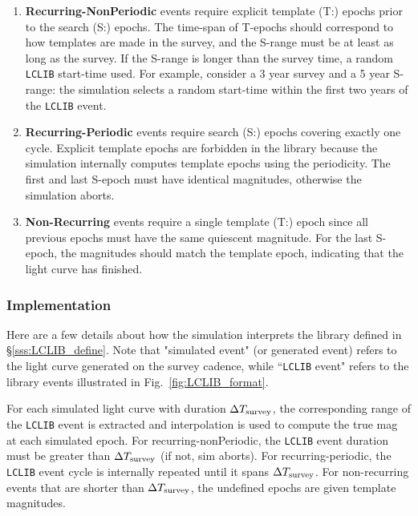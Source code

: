 \documentclass[12pt]{article}
\begin{document}
\begin{enumerate}
  \item {\bf Recurring-NonPeriodic} events require explicit template (T:) 
      epochs prior to the search (S:) epochs.  
      The time-span of T-epochs should correspond to how templates are
      made in the survey, and the S-range must be at least as long as 
      the survey. If the S-range is longer than the survey time, 
      a random {\tt LCLIB} start-time  used. For example, 
      consider a 3 year survey and a 5 year S-range:
      the simulation selects a random start-time within the first two 
      years of the  {\tt LCLIB} event.
%           
   \item  {\bf Recurring-Periodic} events require search (S:) epochs covering exactly one cycle.
             Explicit template epochs are forbidden in the library because the simulation 
             internally computes template epochs using the periodicity. 
             The first and last S-epoch must have identical magnitudes, otherwise the simulation
             aborts.
%
   \item {\bf Non-Recurring} events require a single template (T:) epoch since all previous
            epochs must have the same quiescent magnitude. For the last S-epoch,
            the magnitudes should match the template epoch, indicating that the light curve
            has finished.
\end{enumerate}

\newcommand{\dTsim}{\Delta T_{\rm survey}}
\newcommand{\dTtot}{\Delta T_{\rm Tot}}
\newcommand{\dTevt}{\Delta T_{\rm evt}}
\newcommand{\AVGnonrecur}{ \langle N_{\rm gen}\rangle}
\newcommand{\Nnonrecur}{ N_{\rm gen} }

\subsubsection{ Implementation }
\label{sss:LCLIB_implem}
Here are a few details about how the simulation interprets the library 
defined in \S\ref{sss:LCLIB_define}. Note that "simulated event" 
(or generated event) refers to the light curve generated on the 
survey cadence, while ``{\tt LCLIB} event" refers to the library 
events illustrated in Fig.~\ref{fig:LCLIB_format}.

For each simulated light curve with duration
$\dTsim$, the corresponding range of the {\tt LCLIB} event is extracted and
interpolation is used to compute the  true mag at each simulated epoch.
For  recurring-nonPeriodic, the {\tt LCLIB} event duration must be greater
than $\dTsim$ (if not, sim aborts). For recurring-periodic, the {\tt LCLIB}
event cycle is internally repeated until it spans $\dTsim$.
For non-recurring events that are shorter than $\dTsim$, the undefined
epochs are given template magnitudes. 
\end{document}

